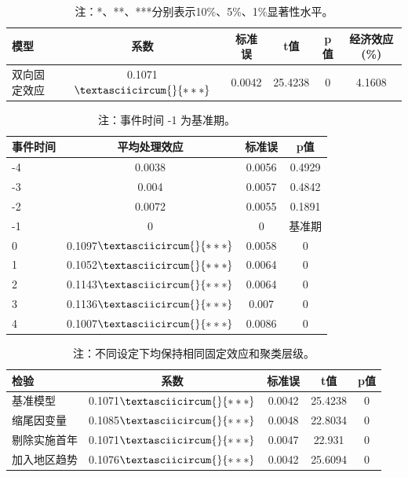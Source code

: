 \documentclass[12pt,a4paper]{article}
\begin{document}
\begin{table}[!htbp]
\centering
\caption{基准回归结果}
\setlength{\tabcolsep}{4pt}
\begin{tabular*}{\textwidth}{@{\extracolsep{\fill}}lccccc}
\toprule
模型 & 系数 & 标准误 & t值 & p值 & 经济效应(\%) \\
\midrule
双向固定效应 & 0.1071$\textasciicircum{}{***}$ & 0.0042 & 25.4238 & 0 & 4.1608 \\
\bottomrule
\end{tabular*}
\caption*{\footnotesize 注：*、**、***分别表示10\%、5\%、1\%显著性水平。}
\end{table}

\begin{table}[!htbp]
\centering
\caption{动态效应估计}
\setlength{\tabcolsep}{4pt}
\begin{tabular*}{\textwidth}{@{\extracolsep{\fill}}lccc}
\toprule
事件时间 & 平均处理效应 & 标准误 & p值 \\
\midrule
-4 & 0.0038 & 0.0056 & 0.4929 \\
-3 & 0.004 & 0.0057 & 0.4842 \\
-2 & 0.0072 & 0.0055 & 0.1891 \\
-1 & 0 & 0 & 基准期 \\
0 & 0.1097$\textasciicircum{}{***}$ & 0.0058 & 0 \\
1 & 0.1052$\textasciicircum{}{***}$ & 0.0064 & 0 \\
2 & 0.1143$\textasciicircum{}{***}$ & 0.0064 & 0 \\
3 & 0.1136$\textasciicircum{}{***}$ & 0.007 & 0 \\
4 & 0.1007$\textasciicircum{}{***}$ & 0.0086 & 0 \\
\bottomrule
\end{tabular*}
\caption*{\footnotesize 注：事件时间 -1 为基准期。}
\end{table}

\begin{table}[!htbp]
\centering
\caption{稳健性检验}
\setlength{\tabcolsep}{4pt}
\begin{tabular*}{\textwidth}{@{\extracolsep{\fill}}lcccc}
\toprule
检验 & 系数 & 标准误 & t值 & p值 \\
\midrule
基准模型 & 0.1071$\textasciicircum{}{***}$ & 0.0042 & 25.4238 & 0 \\
缩尾因变量 & 0.1085$\textasciicircum{}{***}$ & 0.0048 & 22.8034 & 0 \\
剔除实施首年 & 0.1071$\textasciicircum{}{***}$ & 0.0047 & 22.931 & 0 \\
加入地区趋势 & 0.1076$\textasciicircum{}{***}$ & 0.0042 & 25.6094 & 0 \\
\bottomrule
\end{tabular*}
\caption*{\footnotesize 注：不同设定下均保持相同固定效应和聚类层级。}
\end{table}
\end{document}
